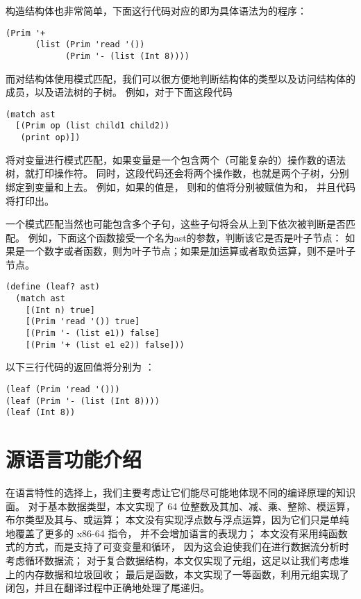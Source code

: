 构造结构体也非常简单，下面这行代码对应的即为具体语法为的程序：
\begin{lstlisting}
(Prim '+
      (list (Prim 'read '())
            (Prim '- (list (Int 8))))
\end{lstlisting}

而对结构体使用模式匹配，我们可以很方便地判断结构体的类型以及访问结构体的成员，以及语法树的子树。
例如，对于下面这段代码
\begin{lstlisting}
(match ast
  [(Prim op (list child1 child2))
   (print op)])
\end{lstlisting}
将对变量进行模式匹配，如果变量是一个包含两个（可能复杂的）操作数的语法树，就打印操作符。
同时，这段代码还会将两个操作数，也就是两个子树，分别绑定到变量和上去。
例如，如果的值是，
则和的值将分别被赋值为和，
并且代码将打印出\code{+}。

一个模式匹配当然也可能包含多个子句，这些子句将会从上到下依次被判断是否匹配。
例如，下面这个函数接受一个名为ast的参数，判断该它是否是叶子节点：
如果是一个数字或者函数，则为叶子节点；如果是加运算或者取负运算，则不是叶子节点。
\begin{lstlisting}
(define (leaf? ast)
  (match ast
    [(Int n) true]
    [(Prim 'read '()) true]
    [(Prim '- (list e1)) false]
    [(Prim '+ (list e1 e2)) false]))
\end{lstlisting}

以下三行代码的返回值将分别为 ：
\begin{lstlisting}
(leaf (Prim 'read '()))
(leaf (Prim '- (list (Int 8))))
(leaf (Int 8))
\end{lstlisting}

\section{源语言功能介绍}

在语言特性的选择上，我们主要考虑让它们能尽可能地体现不同的编译原理的知识面。
对于基本数据类型，本文实现了 64 位整数及其加、减、乘、整除、模运算，布尔类型及其与、或运算；
本文没有实现浮点数与浮点运算，因为它们只是单纯地覆盖了更多的 x86-64 指令，
并不会增加语言的表现力；
本文没有采用纯函数式的方式，而是支持了可变变量和循环，
因为这会迫使我们在进行数据流分析时考虑循环数据流；
对于复合数据结构，本文仅实现了元组，这足以让我们考虑堆上的内存数据和垃圾回收；
最后是函数，本文实现了一等函数，利用元组实现了闭包，并且在翻译过程中正确地处理了尾递归。

